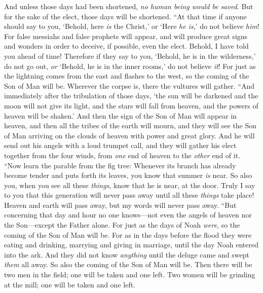 \begin{biblechapter}
\verse And unless those days had been shortened, \textit{no human being would be saved}. But for the sake of the elect, those days will be shortened.
\verse “At that time if anyone should say to you, ‘Behold, here \textit{is} the Christ,’ or ‘Here \textit{he is},’ do not believe \textit{him}!
\verse For false messiahs and false prophets will appear, and will produce great signs and wonders in order to deceive, if possible, even the elect.
\verse Behold, I have told you ahead of time!
\verse Therefore if they say to you, ‘Behold, he is in the wilderness,’ do not go out, \textit{or} ‘Behold, he is in the inner rooms,’ do not believe \textit{it}!
\verse For just as the lightning comes from the east and flashes to the west, so the coming of the Son of Man will be.
\verse Wherever the corpse is, there the vultures will gather.
 “And immediately after the tribulation of those days, ‘the sun will be darkened 
and the moon will not give its light, 
and the stars will fall from heaven, 
and the powers of heaven will be shaken.’
\verse And then the sign of the Son of Man will appear in heaven, and then all the tribes of the earth will mourn, and they will see the Son of Man arriving on the clouds of heaven with power and great glory.
\verse And he will send out his angels with a loud trumpet call, and they will gather his elect together from the four winds, from \textit{one} end of heaven to the \textit{other} end of it.
 “Now learn the parable from the fig tree: Whenever its branch has already become tender and puts forth its leaves, you know that summer \textit{is} near.
\verse So also you, when you see all these \textit{things}, know that he is near, at the door.
\verse Truly I say to you that this generation will never pass away until all these \textit{things} take place!
\verse Heaven and earth will pass away, but my words will never pass away.
 “But concerning that day and hour no one knows—not even the angels of heaven nor the Son—except the Father alone.
\verse For just as the days of Noah \textit{were}, so the coming of the Son of Man will be.
\verse For as in the days before the flood they were eating and drinking, marrying and giving in marriage, until the day Noah entered into the ark.
\verse And they did not know \textit{anything} until the deluge came and swept \textit{them} all away. So also the coming of the Son of Man will be.
\verse Then there will be two men in the field; one will be taken and one left.
\verse Two women will be grinding at the mill; one will be taken and one left.

\end{biblechapter}
